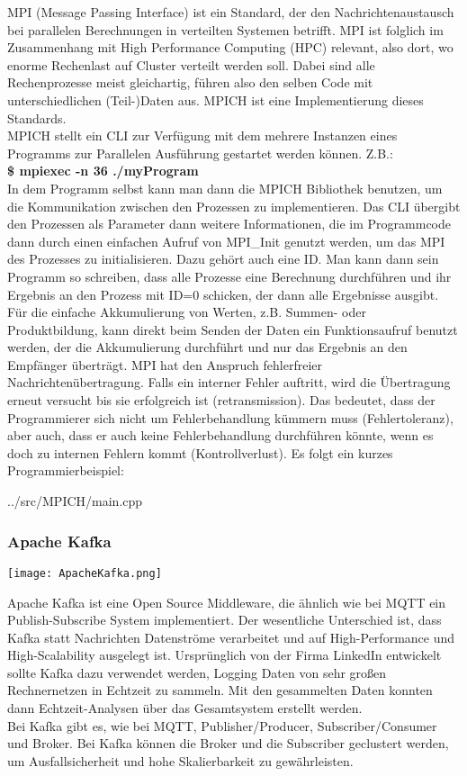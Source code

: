 MPI (Message Passing Interface) ist ein Standard, der den Nachrichtenaustausch bei parallelen Berechnungen in verteilten Systemen betrifft. MPI ist folglich im Zusammenhang mit High Performance Computing (HPC) relevant, also dort, wo enorme Rechenlast auf Cluster verteilt werden soll. Dabei sind alle Rechenprozesse meist gleichartig, führen also den selben Code mit unterschiedlichen (Teil-)Daten aus. MPICH ist eine Implementierung dieses Standards.\\
MPICH stellt ein CLI zur Verfügung mit dem mehrere Instanzen eines Programms zur Parallelen Ausführung gestartet werden können. Z.B.:\\
\textbf{\$ mpiexec -n 36 ./myProgram}\\
In dem Programm selbst kann man dann die MPICH Bibliothek benutzen, um die Kommunikation zwischen den Prozessen zu implementieren. Das CLI übergibt den Prozessen als Parameter dann weitere Informationen, die im Programmcode dann durch einen einfachen Aufruf von MPI\_Init genutzt werden, um das MPI des Prozesses zu initialisieren. Dazu gehört auch eine ID. Man kann dann sein Programm so schreiben, dass alle Prozesse eine Berechnung durchführen und ihr Ergebnis an den Prozess mit ID=0 schicken, der dann alle Ergebnisse ausgibt. Für die einfache Akkumulierung von Werten, z.B. Summen- oder Produktbildung, kann direkt beim Senden der Daten ein Funktionsaufruf benutzt werden, der die Akkumulierung durchführt und nur das Ergebnis an den Empfänger überträgt. MPI hat den Anspruch fehlerfreier Nachrichtenübertragung. Falls ein interner Fehler auftritt, wird die Übertragung erneut versucht bis sie erfolgreich ist (retransmission). Das bedeutet, dass der Programmierer sich nicht um Fehlerbehandlung kümmern muss (Fehlertoleranz), aber auch, dass er auch keine Fehlerbehandlung durchführen könnte, wenn es doch zu internen Fehlern kommt (Kontrollverlust). Es folgt ein kurzes Programmierbeispiel:

\begin{lstinputlisting}[language=C++]
    {../src/MPICH/main.cpp}
\end{lstinputlisting}

\subsubsection{Apache Kafka}

\texttt{[image: ApacheKafka.png]}

Apache Kafka ist eine Open Source Middleware, die ähnlich wie bei MQTT ein Publish-Subscribe System implementiert. Der wesentliche Unterschied ist, dass Kafka statt Nachrichten Datenströme verarbeitet und auf High-Performance und High-Scalability ausgelegt ist. Ursprünglich von der Firma LinkedIn entwickelt sollte Kafka dazu verwendet werden, Logging Daten von sehr großen Rechnernetzen in Echtzeit zu sammeln. Mit den gesammelten Daten konnten dann Echtzeit-Analysen über das Gesamtsystem erstellt werden.\\
Bei Kafka gibt es, wie bei MQTT, Publisher/Producer, Subscriber/Consumer und Broker. Bei Kafka können die Broker und die Subscriber geclustert werden, um Ausfallsicherheit und hohe Skalierbarkeit zu gewährleisten.

